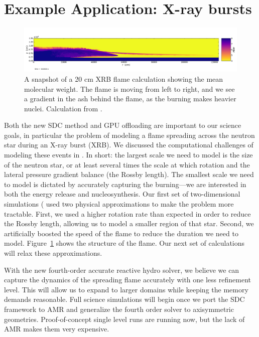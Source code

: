 \documentclass[a4paper]{jpconf}
\begin{document}
\section{Example Application: X-ray bursts}

\begin{figure}[t]
\centering
\includegraphics[width=\linewidth]{flame_wave_smallplt131070_slice}
\caption{\label{fig:xrb} A snapshot of a 20 cm XRB flame calculation showing
the mean molecular weight.  The flame is moving from left to right, and we see
a gradient in the ash behind the flame, as the burning makes heavier nuclei.  
Calculation from \cite{eiden:2019}.}
\end{figure}

Both the new SDC method and GPU offloading are important to our
science goals, in particular the problem of modeling a flame spreading
across the neutron star during an X-ray burst (XRB).  We discussed the
computational challenges of modeling these events in
\cite{astronum:2018}.  In short: the largest scale we need to model is
the size of the neutron star, or at least several times the scale at
which rotation and the lateral pressure gradient balance (the Rossby
length).  The smallest scale we need to model is dictated by
accurately capturing the burning---we are interested in both the
energy release and nucleosynthesis.  Our first set of two-dimensional simulations
(\cite{astronum:2018,eiden:2019} used two physical approximations to
make the problem more tractable.  First, we used a higher rotation
rate than expected in order to reduce the Rossby length, allowing us
to model a smaller region of that star.  Second, we artificially
boosted the speed of the flame to reduce the duration we need to
model.  Figure~\ref{fig:xrb} shows the structure of the flame.  Our next set of calculations will relax these approximations.

With the new fourth-order accurate reactive hydro solver, we believe
we can capture the dynamics of the spreading flame accurately with one
less refinement level.  This will allow us to expand to larger domains
while keeping the memory demands reasonable.  Full science simulations
will begin once we port the SDC framework to AMR and generalize the
fourth order solver to axisymmetric geometries.  Proof-of-concept single
level runs are running now, but the lack of AMR makes them very
expensive.
\end{document}

